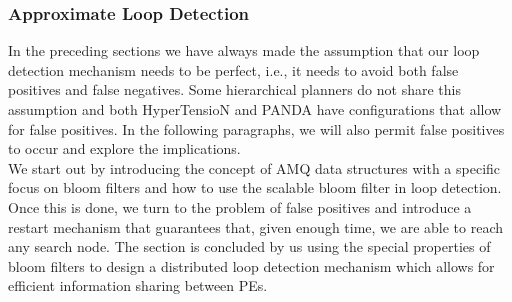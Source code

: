 \subsubsection{Approximate Loop Detection}
\label{ld - approximate loop detection}
In the preceding sections we have always made the assumption that our loop detection mechanism needs to be perfect, i.e., it needs to avoid both false positives and false negatives. Some hierarchical planners do not share this assumption and both HyperTensioN and PANDA have configurations that allow for false positives. In the following paragraphs, we will also permit false positives to occur and explore the implications. \\
We start out by introducing the concept of AMQ data structures with a specific focus on bloom filters and how to use the scalable bloom filter in loop detection. Once this is done, we turn to the problem of false positives and introduce a restart mechanism that guarantees that, given enough time, we are able to reach any search node. The section is concluded by us using the special properties of bloom filters to design a distributed loop detection mechanism which allows for efficient information sharing between PEs.
\begin{comment}
- so far: loop detection is perfect
- what if we drop this assumption of no false positives?
- short overview over AMQ data structures, focus on bloom filters
- explore the implications on completeness
- how does this help us with distributed loop detection?
\end{comment}

